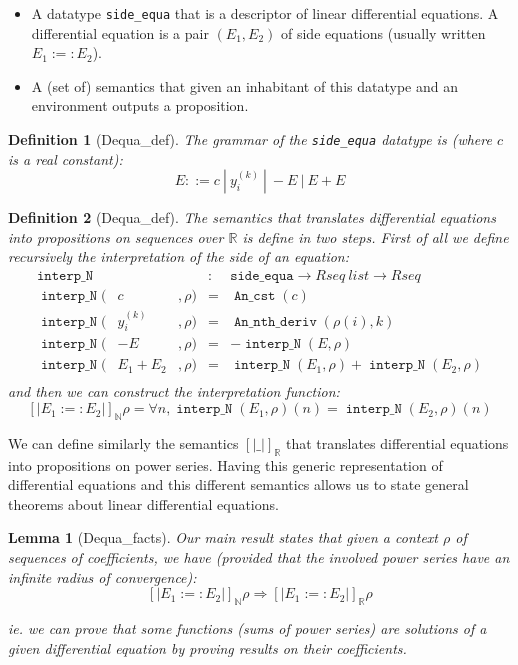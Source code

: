 \documentclass[submission,copyright]{eptcs}
\newcommand{\N}{\mathbb{N}}
\newcommand{\R}{\mathbb{R}}
\DeclareMathOperator{\C}{\mathtt{An\_cst}}
\DeclareMathOperator{\Dn}{\mathtt{An\_nth\_deriv}}
\DeclareMathOperator{\IN}{\mathtt{interp\_N}}
\newtheorem{definition}{Definition}
\newtheorem{lemma}{Lemma}
\begin{document}
\begin{itemize}
 \item A datatype \texttt{side\_equa} that is a descriptor of linear 
   differential equations. A differential equation is a pair $(E_1,E_2)$
	of side equations (usually written $E_1 :=: E_2$).
 
 \item A (set of) semantics that given an inhabitant of this datatype
	and an environment outputs a proposition.
\end{itemize}

\begin{definition}[Dequa\_def] The grammar of the \texttt{side\_equa}
datatype is (where $c$ is a real constant):
$$E ::= c ~|~ y_i^{(k)} ~|~ - E ~|~ E + E$$\end{definition}


\begin{definition}[Dequa\_def] The semantics that translates differential
equations into propositions on sequences over $\R$ is define in two steps.
First of all we define recursively the interpretation of the side
of an equation:$$\begin{array}{lclcl}
\IN{}& & & : & \texttt{side\_equa} \rightarrow Rseq~list \rightarrow Rseq \\
\IN{}(& c &, \rho) & = & \C{}(c)\\
\IN{}(& y_i^{(k)} &, \rho) & = & \Dn{}(\rho(i),k) \\
\IN{}(& - E &, \rho) & = & - \IN{}(E,\rho)\\
\IN{}(& E_1 + E_2 &, \rho) & = & \IN{}(E_1,\rho) + \IN{}(E_2,\rho)\\
\end{array}$$
and then we can construct the interpretation function:
$$\left[\left| E_1 :=: E_2 \right|\right]_\N \rho = \forall n,
\IN{}(E_1,\rho)(n) = \IN{}(E_2,\rho)(n)$$\end{definition}

We can define similarly the semantics $\left[\left| \_ \right|\right]_\R$
that translates differential equations into propositions on power series.
Having this generic representation of differential equations and this
different semantics allows us to state general theorems about linear
differential equations.

\begin{lemma}[Dequa\_facts] Our main result states that given a context
$\rho$ of sequences of coefficients, we have (provided that the involved
power series have an infinite radius of convergence):
$$\left[\left| E_1 :=: E_2 \right|\right]_\N \rho \Rightarrow
\left[\left| E_1 :=: E_2 \right|\right]_\R \rho$$

ie. we can prove that some functions (sums of power series) are solutions
of a given differential equation by proving results on their coefficients.
\end{lemma}
\end{document}
